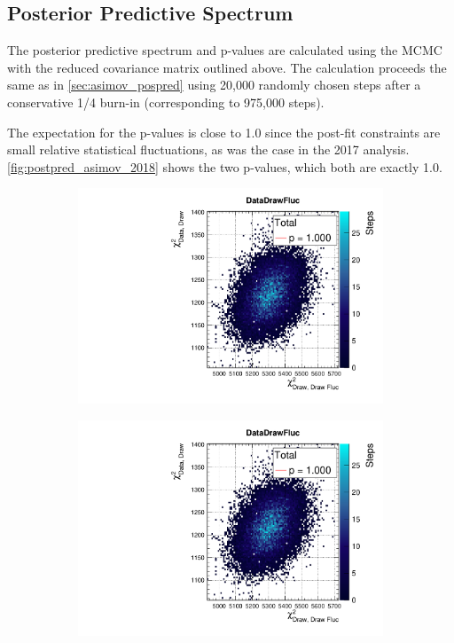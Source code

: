\subsection{Posterior Predictive Spectrum}
The posterior predictive \pmu \cosmu spectrum and p-values are calculated using the MCMC with the reduced covariance matrix outlined above. The calculation proceeds the same as in \autoref{sec:asimov_pospred} using 20,000 randomly chosen steps after a conservative 1/4 burn-in (corresponding to 975,000 steps). 

The expectation for the p-values is close to 1.0 since the post-fit constraints are small relative statistical fluctuations, as was the case in the 2017 analysis. \autoref{fig:postpred_asimov_2018} shows the two p-values, which both are exactly 1.0. 
\begin{figure}[h]
	\begin{subfigure}[t]{0.49\textwidth}
		\includegraphics[width=\textwidth, trim={0mm 0mm 0mm 11mm}, clip,page=1]{figures/mach3/2018/asimov/pred/2018a_MultiPi_Binningv6_NewCov_Asimov_merge_PostPredStore_SampLLH_procs}
	\end{subfigure}
	\begin{subfigure}[t]{0.49\textwidth}
		\includegraphics[width=\textwidth, trim={0mm 0mm 0mm 11mm}, clip,page=2]{figures/mach3/2018/asimov/pred/2018a_MultiPi_Binningv6_NewCov_Asimov_merge_PostPredStore_SampLLH_procs}

\end{subfigure}
\end{figure}
